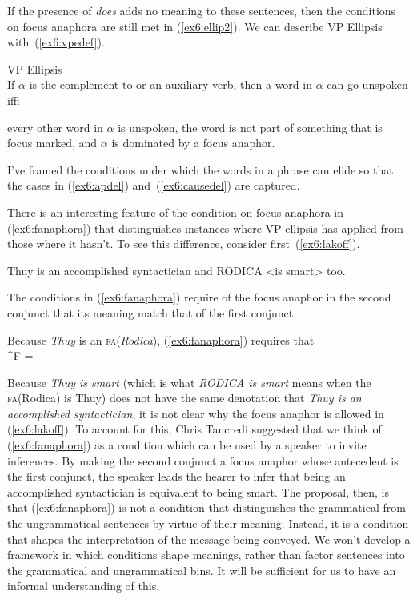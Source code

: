 If the presence of \emph{does} adds no meaning to these sentences, then the conditions on focus anaphora are still met in (\ref{ex6:ellip2}). We can describe VP Ellipsis with~(\ref{ex6:vpedef}).
\begin{exe}
	\raggedright
	\ex \label{ex6:vpedef} VP Ellipsis\\
	If $\alpha$ is the complement to  or an auxiliary verb, then a word in $\alpha$ can go unspoken iff:
	\begin{xlist}
		\ex every other word in $\alpha$ is unspoken,
		\ex the word is not part of something that is focus marked, and
		\ex $\alpha$ is dominated by a focus anaphor.
	\end{xlist}
\end{exe}
I've framed the conditions under which the words in a phrase can elide so that the cases in (\ref{ex6:apdel}) and~(\ref{ex6:causedel}) are captured.

There is an interesting feature of the condition on focus anaphora in (\ref{ex6:fanaphora}) that distinguishes instances where VP ellipsis has applied from those where it hasn't. To see this difference, consider first~(\ref{ex6:lakoff}).%
%
%
%
\begin{exe}
	\raggedright
	\ex \label{ex6:lakoff}
	Thuy is an accomplished syntactician and RODICA <is smart> too.
\end{exe}
The conditions in (\ref{ex6:fanaphora}) require of the focus anaphor in the second conjunct that its meaning match that of the first conjunct.
\begin{exe}
	\raggedright
	\ex \label{ex6:lakofff}
	Because \emph{Thuy} is an \textsc{fa}(\emph{Rodica}), (\ref{ex6:fanaphora}) requires that\\ ^F = 
\end{exe}
Because \emph{Thuy is smart} (which is what \emph{RODICA is smart} means when the \textsc{fa}(Rodica) is Thuy) does not have the same denotation that \emph{Thuy is an accomplished syntactician}, it is not clear why the focus anaphor is allowed in (\ref{ex6:lakoff}). To account for this, Chris Tancredi suggested that we think of (\ref{ex6:fanaphora}) as a condition which can be used by a speaker to invite inferences.\cite{Tancredi:1992} By making the second conjunct a focus anaphor whose antecedent is the first conjunct, the speaker leads the hearer to infer that being an accomplished syntactician is equivalent to being smart. The proposal, then, is that (\ref{ex6:fanaphora}) is not a condition that distinguishes the grammatical from the ungrammatical sentences by virtue of their meaning. Instead, it is a condition that shapes the interpretation of the message being conveyed. We won't develop a framework in which conditions shape meanings, rather than factor sentences into the grammatical and ungrammatical bins. %
%
% 
It will be sufficient for us to have an informal understanding of this.

